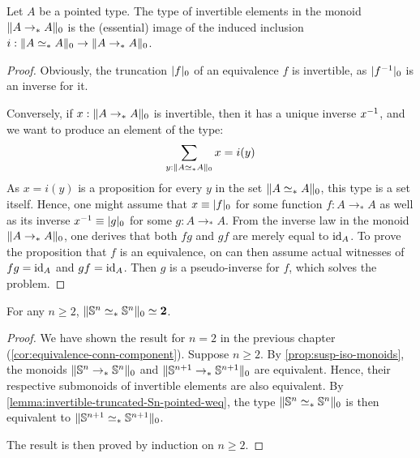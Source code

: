 \documentclass[english,a4]{article}
\newcommand{\ptdto}{\to_\ast}%
\newcommand{\ptdweq}{\weq_\ast}%
\newcommand{\setTrunc}[1]{\Trunc{#1}_0}
\newcommand{\settrunc}[1]{\trunc{#1}_0}
\begin{document}
\begin{lemma}
    Let $A$ be a pointed type. The type of invertible elements in the monoid $\setTrunc{A \ptdto A}$
    is the (essential) image of the induced inclusion $i:\setTrunc{A \ptdweq A} \to
    \setTrunc{A \ptdto A}$.
    \label{lemma:invertible-truncated-Sn-pointed-weq}
\end{lemma}
\begin{proof}
    Obviously, the truncation $\settrunc{f}$ of an equivalence $f$ is invertible,
    as $\settrunc{\inv f}$ is an inverse for it.
    
    Conversely, if $x:\setTrunc{A \ptdto A}$ is invertible, then 
    it has a unique inverse ${x}^{-1}$, and we want to
    produce an element of the type:
    \begin{displaymath}
    \sum_{y:\setTrunc{A \ptdweq A}} x = i(y)
    \end{displaymath}
    As $x=i(y)$ is a proposition for every $y$ in the set $\setTrunc{A
        \ptdweq A}$, this type is a set itself. Hence, one might assume
    that $x \jdeq \settrunc f$ for some function $f:A \ptdto A$ as well
    as its inverse $\inv x \jdeq \settrunc g$ for some $g:A \ptdto A$. 
    From the inverse law in the monoid $\setTrunc{A \ptdto A}$, one
    derives that both $fg$ and $gf$ are merely equal to $\mathord{\mathrm{id}}_{A}$. To prove
    the proposition that $f$ is an equivalence, on can then assume actual
    witnesses of $fg=\mathord{\mathrm{id}}_{A}$ and $gf=\mathord{\mathrm{id}}_{A}$. Then $g$ is a
    pseudo-inverse for $f$, which solves the problem.
\end{proof}

\begin{corollary}
    For any $n\geq 2$, $\setTrunc{\Sn n \ptdweq \Sn n} \weq \bn 2$.
    \label{cor:Sn-pointed-weq-is-bool}
\end{corollary}
\begin{proof}
    We have shown the result for $n=2$ in the previous chapter
    (\cref{cor:equivalence-conn-component}). Suppose $n\geq 2$. By
    \cref{prop:susp-iso-monoids}, the monoids $\setTrunc{\Sn n \ptdto \Sn n}$ and
    $\setTrunc{\Sn {n+1} \ptdto \Sn {n+1}}$ are equivalent. Hence, their respective
    submonoids of invertible elements are also equivalent. By
    \cref{lemma:invertible-truncated-Sn-pointed-weq}, the type $\setTrunc{\Sn n
        \ptdweq \Sn n}$ is then equivalent to $\setTrunc{\Sn {n+1} \ptdweq \Sn
        {n+1}}$.
    
    The result is then proved by induction on $n\geq 2$.
\end{proof}
\end{document}
